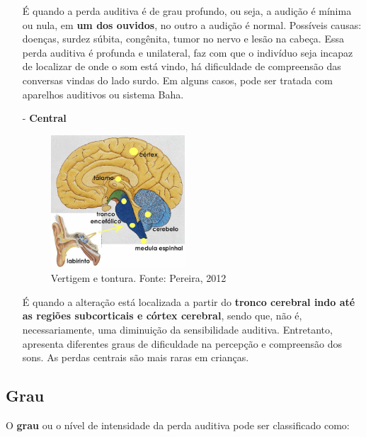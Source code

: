 \documentclass[brasil]{abnt}
\begin{document}
\begin{itemize}
						É quando a perda auditiva é de grau profundo, ou seja, a audição é mínima ou nula, em \textbf{um dos ouvidos}, no outro a audição é normal. Possíveis causas: doenças, surdez súbita, congênita, tumor no nervo e lesão na cabeça.
						Essa perda auditiva é profunda e unilateral, faz com que o indivíduo seja incapaz de localizar de onde o som está vindo, há dificuldade de compreensão das conversas vindas do lado surdo. Em alguns casos, pode ser
						tratada com aparelhos auditivos ou sistema Baha.
						
					\item [-] \textbf{Central} 
											
						\begin{figure}[h]
							\center
							\includegraphics[width=5cm]{pace.png}
							\caption{Vertigem e tontura. Fonte: Pereira, 2012}
						\end{figure}
						
						É quando a alteração está localizada a partir do \textbf{tronco cerebral indo até as regiões subcorticais e córtex cerebral}, sendo que, não é, necessariamente, uma diminuição da sensibilidade auditiva. Entretanto, apresenta
						diferentes graus de dificuldade na percepção e compreensão dos sons. As perdas centrais são mais raras em crianças.
					
				\end{itemize}
					
									
			\subsection{Grau}
				O \textbf{grau} ou o nível de intensidade da perda auditiva pode ser classificado como:
							
\end{document}
